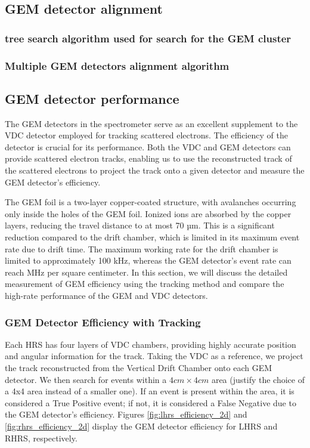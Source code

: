 \subsection{GEM detector alignment}

\subsubsection{tree search algorithm used for search for the GEM cluster}
\subsubsection{Multiple GEM detectors alignment algorithm }
\subsection{GEM detector performance}

The GEM detectors in the spectrometer serve as an excellent supplement to the VDC detector employed for tracking scattered electrons. The efficiency of the detector is crucial for its performance. Both the VDC and GEM detectors can provide scattered electron tracks, enabling us to use the reconstructed track of the scattered electrons to project the track onto a given detector and measure the GEM detector's efficiency.

The GEM foil is a two-layer copper-coated structure, with avalanches occurring only inside the holes of the GEM foil. Ionized ions are absorbed by the copper layers, reducing the travel distance to at most 70 µm. This is a significant reduction compared to the drift chamber, which is limited in its maximum event rate due to drift time. The maximum working rate for the drift chamber is limited to approximately 100 kHz, whereas the GEM detector's event rate can reach MHz per square centimeter. In this section, we will discuss the detailed measurement of GEM efficiency using the tracking method and compare the high-rate performance of the GEM and VDC detectors.

\subsubsection{GEM Detector Efficiency with Tracking}

Each HRS has four layers of VDC chambers, providing highly accurate position and angular information for the track. Taking the VDC as a reference, we project the track reconstructed from the Vertical Drift Chamber onto each GEM detector. We then search for events within a $4 cm \times 4 cm$ area (justify the choice of a 4x4 area instead of a smaller one). If an event is present within the area, it is considered a True Positive event; if not, it is considered a False Negative due to the GEM detector's efficiency. Figures \ref{fig:lhrs_efficiency_2d} and \ref{fig:rhrs_efficiency_2d} display the GEM detector efficiency for LHRS and RHRS, respectively.


